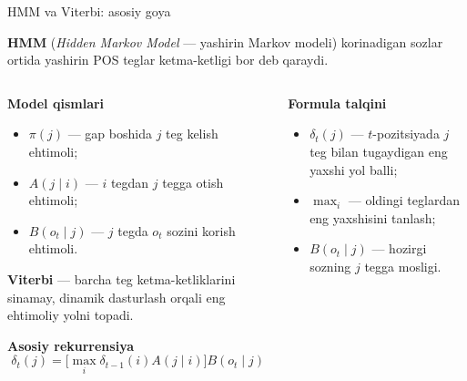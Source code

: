 \documentclass[aspectratio=169,11pt]{beamer}
\newcommand{\uzq}{\textquotesingle{}}
\begin{document}
\begin{frame}{HMM va Viterbi: asosiy g\uzq{}oya}
\footnotesize

\textbf{HMM} (\textit{Hidden Markov Model} — yashirin Markov modeli)
ko\uzq{}rinadigan so\uzq{}zlar ortida yashirin POS teglar ketma-ketligi bor deb qaraydi.

\vspace{3pt}

\begin{columns}[T,totalwidth=\textwidth]
\begin{column}{0.49\textwidth}

\textbf{Model qismlari}

\begin{itemize}\setlength\itemsep{3pt}
  \item $\pi(j)$ — gap boshida $j$ teg kelish ehtimoli;
  \item $A(j\mid i)$ — $i$ tegdan $j$ tegga o\uzq{}tish ehtimoli;
  \item $B(o_t\mid j)$ — $j$ tegda $o_t$ so\uzq{}zini ko\uzq{}rish ehtimoli.
\end{itemize}

\vspace{4pt}

\begin{tcolorbox}[defbox,left=2mm,right=2mm,top=1mm,bottom=1mm]
\scriptsize
\textbf{Viterbi} — barcha teg ketma-ketliklarini sinamay,
dinamik dasturlash orqali eng ehtimoliy yo\uzq{}lni topadi.
\end{tcolorbox}

\vspace{3pt}

\textbf{Asosiy rekurrensiya}
\[
\delta_t(j)=
\Big[\max_i \delta_{t-1}(i)A(j\mid i)\Big]B(o_t\mid j)
\]

\end{column}

\begin{column}{0.47\textwidth}

\textbf{Formula talqini}

\begin{itemize}\setlength\itemsep{3pt}
  \item $\delta_t(j)$ — $t$-pozitsiyada $j$ teg bilan tugaydigan eng yaxshi yo\uzq{}l balli;
  \item $\max_i$ — oldingi teglardan eng yaxshisini tanlash;
  \item $B(o_t\mid j)$ — hozirgi so\uzq{}zning $j$ tegga mosligi.
\end{itemize}


\end{column}
\end{columns}
\end{frame}
\end{document}
